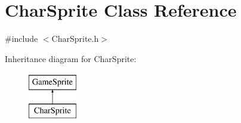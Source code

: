 \hypertarget{class_char_sprite}{}\section{Char\+Sprite Class Reference}
\label{class_char_sprite}


{\ttfamily \#include $<$Char\+Sprite.\+h$>$}

Inheritance diagram for Char\+Sprite\+:\begin{figure}[H]
\begin{center}
\leavevmode
\includegraphics[height=2.000000cm]{class_char_sprite}
\end{center}
\end{figure}
